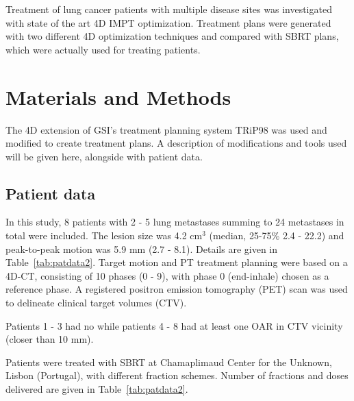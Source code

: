 \documentclass[type=dr, dr=rernat, accentcolor=tud7b,colorbacktitle, bigchapter, openright, twoside, 12pt ]{tudthesis}
\begin{document}
Treatment of lung cancer patients  with multiple disease sites was investigated with state of the art 4D IMPT optimization. 
Treatment plans were generated with two different 4D optimization techniques and compared with SBRT plans, which were actually used for treating patients.


\newpage
\section{Materials and Methods}

The 4D extension of GSI's treatment planning system TRiP98 \cite{Kraemer2000a, Richter2013} was used and modified to create treatment plans. A description of modifications and tools used will be given here, 
alongside with patient data.

\subsection{Patient data}


In this study, 8 patients with 2 - 5 lung metastases summing to 24 metastases in total were included. The lesion size was 4.2 cm$^3$ (median, 25-75\% 2.4 - 22.2) and peak-to-peak motion was 5.9 mm (2.7 - 8.1). 
Details are given in Table~\ref{tab:patdata2}.
Target motion and PT treatment planning were based on a 4D-CT, consisting of 10 phases (0 - 9), with phase 0 (end-inhale) chosen as a reference phase.
A registered positron emission tomography (PET) scan was used to delineate clinical target volumes (CTV). 

Patients 1 - 3 had no while patients 4 - 8 had at least one OAR in CTV vicinity (closer than 10 mm).

Patients were treated with SBRT at Chamaplimaud Center for the Unknown, Lisbon (Portugal), with different fraction schemes. 
Number of fractions and doses delivered are given in Table~\ref{tab:patdata2}.

\newpage
\end{document}
